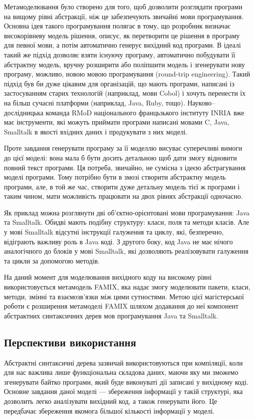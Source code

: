 \documentclass[12pt,a4paper]{article}
\begin{document}
Метамоделювання було створено для того, щоб дозволити розглядати програми на вищому рівні абстракції, ніж це забезпечують звичайні мови програмування. Основна ідея такого програмування полягає в тому, що розробник визначає високорівневу модель рішення, описує, як перетворити це рішення в програму для певної мови, а потім автоматично генерує вихідний код програми. В ідеалі такий же підхід дозволяє взяти існуючу програму, автоматично побудувати її абстрактну модель, вручну розширити або поліпшити модель і згенерувати нову програму, можливо, новою мовою програмування (round-trip engineering). Такий підхід був би дуже цікавим для організацій, що мають програми, написані із застосуванням старих технологій (наприклад, мови Cobol) і хочуть перенести їх на більш сучасні платформи (наприклад, Java, Ruby, тощо). Науково--дослідницька команда RMoD національного францьзького інституту INRIA вже має інструменти, які можуть приймати програми написані мовами C, Java, Smalltalk в якості вхідних даних і продукувати з них моделі.

Проте завдання генерувати програму за її моделлю висуває суперечливі вимоги до цієї моделі: вона мала б бути досить детальною щоб дати змогу відновити повний текст програми. Ця потреба, звичайно, не сумісна з ідеєю абстрагування моделі програми. Тому потрібно бути в змозі створити абстрактну модель програми, але, в той же час, створити дуже детальну модель тієї ж програми і таким чином, мати можливість працювати на двох рівнях абстракції одночасно.

Як приклад можна розглянути дві об'єктно-орієнтовані мови програмування: Java та Smalltalk. Обидві мають подібну структуру: класи, поля та методи класів. Але у мові Smalltalk відсутні інструкції галуження та циклу, які, безперечно, відіграють важливу роль в Java коді. З другого боку, код Java не має нічого аналогічного до блоків у мові Smalltalk, які дозволяють реалізовувати галуження та цикли за допомогою методів.

На даний момент для моделювання вихідного коду на високому рівні використовується метамодель FAMIX, яка надає змогу моделювати пакети, класи, методи, змінні та взаємозв'язки між цими сутностями. Метою цієї магістерської роботи є розширення метамоделі FAMIX шляхом додавання до неї компонент абстрактних синтаксичних дерев мов програмування Java та Smalltalk.

\subsection{Перспективи використання}
Абстрактні синтаксичні дерева зазвичай використовуються при компіляції, коли для нас важлива лише функціональна складова даних, маючи яку ми зможемо згенерувати байтко програми, який буде виконуваті дії записані у вихідному коді. Основне завдання даної моделі --- збереження інформації у такій структурі, яка дозволить легко аналізувати вихідний код, а також генерувати його. Це передбачає збереження якомога більшої кількості інформації у моделі.
\end{document}
